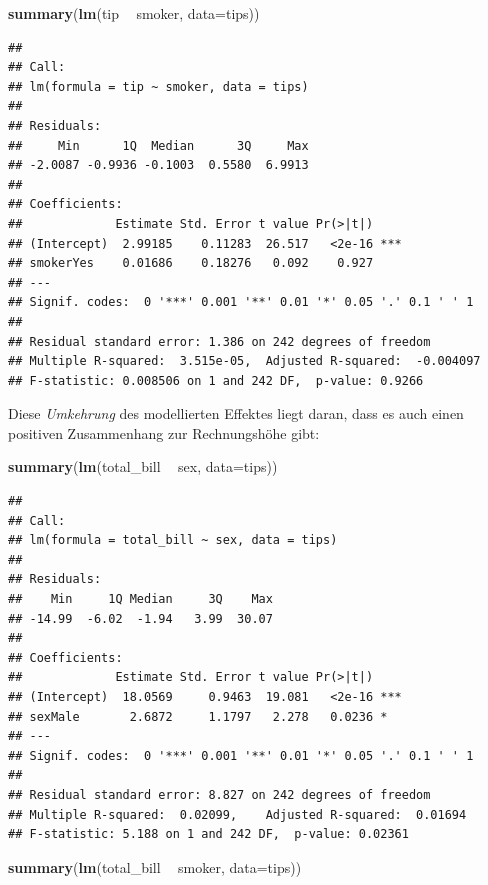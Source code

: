 \documentclass[12pt,ngerman,paper=a4,pagesize,DIV=13]{scrreprt}
\newenvironment{Shaded}{\begin{snugshade}}{\end{snugshade}}
\newcommand{\DataTypeTok}[1]{\textcolor[rgb]{0.13,0.29,0.53}{#1}}
\newcommand{\KeywordTok}[1]{\textcolor[rgb]{0.13,0.29,0.53}{\textbf{#1}}}
\newcommand{\NormalTok}[1]{#1}
\newcommand{\OperatorTok}[1]{\textcolor[rgb]{0.81,0.36,0.00}{\textbf{#1}}}
\newcommand{\StringTok}[1]{\textcolor[rgb]{0.31,0.60,0.02}{#1}}
\begin{document}
\begin{Shaded}
\begin{Highlighting}[]
\KeywordTok{summary}\NormalTok{(}\KeywordTok{lm}\NormalTok{(tip }\OperatorTok{~}\StringTok{ }\NormalTok{smoker, }\DataTypeTok{data=}\NormalTok{tips))}
\end{Highlighting}
\end{Shaded}

\begin{verbatim}
## 
## Call:
## lm(formula = tip ~ smoker, data = tips)
## 
## Residuals:
##     Min      1Q  Median      3Q     Max 
## -2.0087 -0.9936 -0.1003  0.5580  6.9913 
## 
## Coefficients:
##             Estimate Std. Error t value Pr(>|t|)    
## (Intercept)  2.99185    0.11283  26.517   <2e-16 ***
## smokerYes    0.01686    0.18276   0.092    0.927    
## ---
## Signif. codes:  0 '***' 0.001 '**' 0.01 '*' 0.05 '.' 0.1 ' ' 1
## 
## Residual standard error: 1.386 on 242 degrees of freedom
## Multiple R-squared:  3.515e-05,  Adjusted R-squared:  -0.004097 
## F-statistic: 0.008506 on 1 and 242 DF,  p-value: 0.9266
\end{verbatim}

Diese \emph{Umkehrung} des modellierten Effektes liegt daran, dass es
auch einen positiven Zusammenhang zur Rechnungshöhe gibt:

\begin{Shaded}
\begin{Highlighting}[]
\KeywordTok{summary}\NormalTok{(}\KeywordTok{lm}\NormalTok{(total_bill }\OperatorTok{~}\StringTok{ }\NormalTok{sex, }\DataTypeTok{data=}\NormalTok{tips))}
\end{Highlighting}
\end{Shaded}

\begin{verbatim}
## 
## Call:
## lm(formula = total_bill ~ sex, data = tips)
## 
## Residuals:
##    Min     1Q Median     3Q    Max 
## -14.99  -6.02  -1.94   3.99  30.07 
## 
## Coefficients:
##             Estimate Std. Error t value Pr(>|t|)    
## (Intercept)  18.0569     0.9463  19.081   <2e-16 ***
## sexMale       2.6872     1.1797   2.278   0.0236 *  
## ---
## Signif. codes:  0 '***' 0.001 '**' 0.01 '*' 0.05 '.' 0.1 ' ' 1
## 
## Residual standard error: 8.827 on 242 degrees of freedom
## Multiple R-squared:  0.02099,    Adjusted R-squared:  0.01694 
## F-statistic: 5.188 on 1 and 242 DF,  p-value: 0.02361
\end{verbatim}

\begin{Shaded}
\begin{Highlighting}[]
\KeywordTok{summary}\NormalTok{(}\KeywordTok{lm}\NormalTok{(total_bill }\OperatorTok{~}\StringTok{ }\NormalTok{smoker, }\DataTypeTok{data=}\NormalTok{tips))}
\end{Highlighting}
\end{Shaded}
\end{document}
